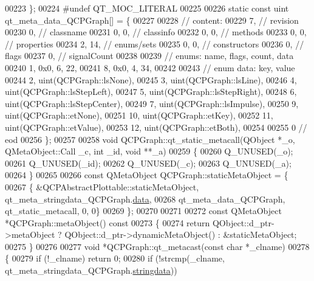 \begin{DoxyCode}
00223 \};
00224 \textcolor{preprocessor}{#undef QT\_MOC\_LITERAL}
00225 
00226 \textcolor{keyword}{static} \textcolor{keyword}{const} uint qt\_meta\_data\_QCPGraph[] = \{
00227 
00228  \textcolor{comment}{// content:}
00229        7,       \textcolor{comment}{// revision}
00230        0,       \textcolor{comment}{// classname}
00231        0,    0, \textcolor{comment}{// classinfo}
00232        0,    0, \textcolor{comment}{// methods}
00233        0,    0, \textcolor{comment}{// properties}
00234        2,   14, \textcolor{comment}{// enums/sets}
00235        0,    0, \textcolor{comment}{// constructors}
00236        0,       \textcolor{comment}{// flags}
00237        0,       \textcolor{comment}{// signalCount}
00238 
00239  \textcolor{comment}{// enums: name, flags, count, data}
00240        1, 0x0,    6,   22,
00241        8, 0x0,    4,   34,
00242 
00243  \textcolor{comment}{// enum data: key, value}
00244        2, uint(QCPGraph::lsNone),
00245        3, uint(QCPGraph::lsLine),
00246        4, uint(QCPGraph::lsStepLeft),
00247        5, uint(QCPGraph::lsStepRight),
00248        6, uint(QCPGraph::lsStepCenter),
00249        7, uint(QCPGraph::lsImpulse),
00250        9, uint(QCPGraph::etNone),
00251       10, uint(QCPGraph::etKey),
00252       11, uint(QCPGraph::etValue),
00253       12, uint(QCPGraph::etBoth),
00254 
00255        0        \textcolor{comment}{// eod}
00256 \};
00257 
00258 \textcolor{keywordtype}{void} QCPGraph::qt\_static\_metacall(QObject *\_o, QMetaObject::Call \_c, \textcolor{keywordtype}{int} \_id, \textcolor{keywordtype}{void} **\_a)
00259 \{
00260     Q\_UNUSED(\_o);
00261     Q\_UNUSED(\_id);
00262     Q\_UNUSED(\_c);
00263     Q\_UNUSED(\_a);
00264 \}
00265 
00266 \textcolor{keyword}{const} QMetaObject QCPGraph::staticMetaObject = \{
00267     \{ &QCPAbstractPlottable::staticMetaObject, qt\_meta\_stringdata\_QCPGraph.\hyperlink{a00016_a52173b02d8396dce2aa3a046123398ea}{data},
00268       qt\_meta\_data\_QCPGraph,  qt\_static\_metacall, 0, 0\}
00269 \};
00270 
00271 
00272 \textcolor{keyword}{const} QMetaObject *QCPGraph::metaObject()\textcolor{keyword}{ const}
00273 \textcolor{keyword}{}\{
00274     \textcolor{keywordflow}{return} QObject::d\_ptr->metaObject ? QObject::d\_ptr->dynamicMetaObject() : &staticMetaObject;
00275 \}
00276 
00277 \textcolor{keywordtype}{void} *QCPGraph::qt\_metacast(\textcolor{keyword}{const} \textcolor{keywordtype}{char} *\_clname)
00278 \{
00279     \textcolor{keywordflow}{if} (!\_clname) \textcolor{keywordflow}{return} 0;
00280     \textcolor{keywordflow}{if} (!strcmp(\_clname, qt\_meta\_stringdata\_QCPGraph.\hyperlink{a00016_a8d599799df5356cb10dc7a790a0e26a2}{stringdata}))

\end{DoxyCode}
